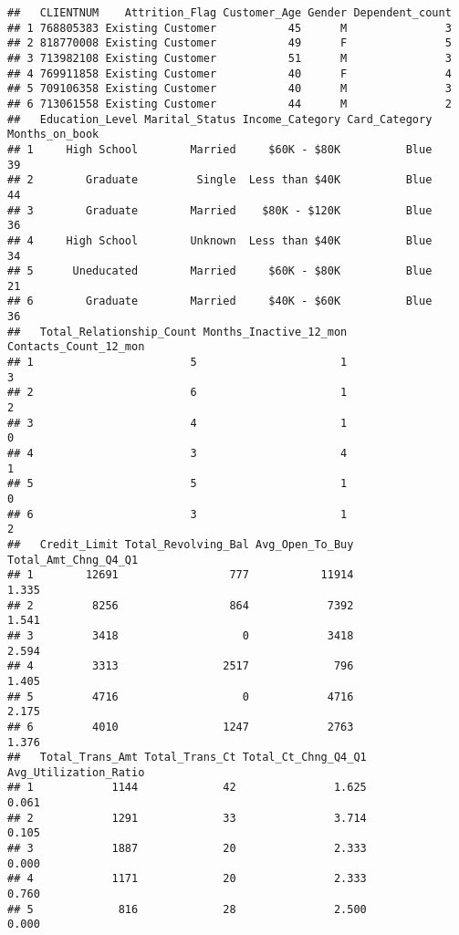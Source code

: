 \documentclass[
]{article}
\begin{document}
\begin{verbatim}
##   CLIENTNUM    Attrition_Flag Customer_Age Gender Dependent_count
## 1 768805383 Existing Customer           45      M               3
## 2 818770008 Existing Customer           49      F               5
## 3 713982108 Existing Customer           51      M               3
## 4 769911858 Existing Customer           40      F               4
## 5 709106358 Existing Customer           40      M               3
## 6 713061558 Existing Customer           44      M               2
##   Education_Level Marital_Status Income_Category Card_Category Months_on_book
## 1     High School        Married     $60K - $80K          Blue             39
## 2        Graduate         Single  Less than $40K          Blue             44
## 3        Graduate        Married    $80K - $120K          Blue             36
## 4     High School        Unknown  Less than $40K          Blue             34
## 5      Uneducated        Married     $60K - $80K          Blue             21
## 6        Graduate        Married     $40K - $60K          Blue             36
##   Total_Relationship_Count Months_Inactive_12_mon Contacts_Count_12_mon
## 1                        5                      1                     3
## 2                        6                      1                     2
## 3                        4                      1                     0
## 4                        3                      4                     1
## 5                        5                      1                     0
## 6                        3                      1                     2
##   Credit_Limit Total_Revolving_Bal Avg_Open_To_Buy Total_Amt_Chng_Q4_Q1
## 1        12691                 777           11914                1.335
## 2         8256                 864            7392                1.541
## 3         3418                   0            3418                2.594
## 4         3313                2517             796                1.405
## 5         4716                   0            4716                2.175
## 6         4010                1247            2763                1.376
##   Total_Trans_Amt Total_Trans_Ct Total_Ct_Chng_Q4_Q1 Avg_Utilization_Ratio
## 1            1144             42               1.625                 0.061
## 2            1291             33               3.714                 0.105
## 3            1887             20               2.333                 0.000
## 4            1171             20               2.333                 0.760
## 5             816             28               2.500                 0.000

\end{verbatim}
\end{document}
